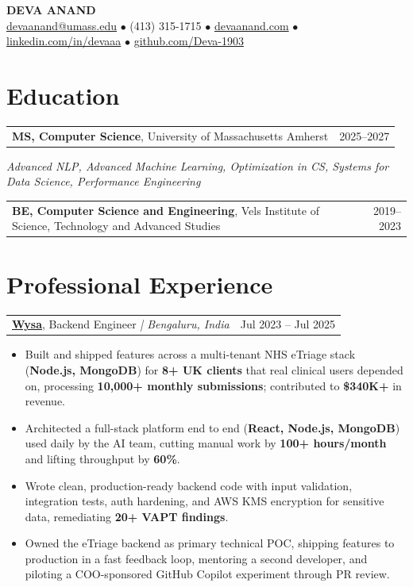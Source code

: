 \documentclass[letterpaper,11pt]{article}
\makeatletter
\newcommand{\eduItem}[3]{%
  \begin{tabular*}{\textwidth}{@{}l@{\extracolsep{\fill}}r@{}}
    \textbf{#1}, #2 & #3 \\
  \end{tabular*}\par
}
\newcommand{\expItem}[4]{%
  \vspace{3pt}
  \begin{tabular*}{\textwidth}{@{}l@{\extracolsep{\fill}}r@{}}
    \textbf{#1}, #2 \textit{| #3} & #4 \\
  \end{tabular*}\par\vspace{-2pt}
}
\makeatother
\begin{document}
\begin{center}
    {\fontsize{18}{20}\selectfont\bfseries DEVA ANAND}\\ \vspace{3pt}
    {\small
    \href{mailto:devaanand@umass.edu}{devaanand@umass.edu}
    \enspace$\bullet$\enspace
    (413) 315-1715
    \enspace$\bullet$\enspace
    \href{https://devaanand.com}{devaanand.com}
    \enspace$\bullet$\enspace
    \href{https://linkedin.com/in/devaaa/}{linkedin.com/in/devaaa}
    \enspace$\bullet$\enspace
    \href{https://github.com/Deva-1903}{github.com/Deva-1903}}
\end{center}
\vspace{-6pt}

\section{Education}
\eduItem{MS, Computer Science}{University of Massachusetts Amherst}{2025--2027}
{\small\textit{Advanced NLP, Advanced Machine Learning, Optimization in CS, Systems for Data Science, Performance Engineering}}\par
\vspace{3pt}
\eduItem{BE, Computer Science and Engineering}{Vels Institute of Science, Technology and Advanced Studies}{2019--2023}

\section{Professional Experience}

\expItem{\href{https://www.wysa.io}{Wysa}}{Backend Engineer}{Bengaluru, India}{Jul 2023 -- Jul 2025}
\begin{itemize}
  \item Built and shipped features across a multi-tenant NHS eTriage stack (\textbf{Node.js, MongoDB}) for \textbf{8+ UK clients} that real clinical users depended on, processing \textbf{10{,}000+ monthly submissions}; contributed to \textbf{\$340K+} in revenue.
  \item Architected a full-stack platform end to end (\textbf{React, Node.js, MongoDB}) used daily by the AI team, cutting manual work by \textbf{100+ hours/month} and lifting throughput by \textbf{60\%}.
  \item Wrote clean, production-ready backend code with input validation, integration tests, auth hardening, and AWS KMS encryption for sensitive data, remediating \textbf{20+ VAPT findings}.
  \item Owned the eTriage backend as primary technical POC, shipping features to production in a fast feedback loop, mentoring a second developer, and piloting a COO-sponsored GitHub Copilot experiment through PR review.
\end{itemize}
\end{document}
